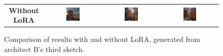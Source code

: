 \begin{figure}[H]
{\begin{tabular}{c c c c}
    \textbf{Without LoRA} &
    \includegraphics[width=0.25\textwidth]{Images/Results/Architect-B_unstructured-phase/generated_images/3/Zonder_lora_00010_.png} &
    \includegraphics[width=0.25\textwidth]{Images/Results/Architect-B_unstructured-phase/generated_images/3/Zonder_lora_00012_.png} & \includegraphics[width=0.25\textwidth]{Images/Results/Architect-B_unstructured-phase/generated_images/3/Zonder_lora_00019_.png} \\
  \end{tabular}
  }
  \caption{Comparison of results with and without LoRA, generated from architect B's third sketch.}
  \label{fig:lora-comparison-2wide}
\end{figure}

